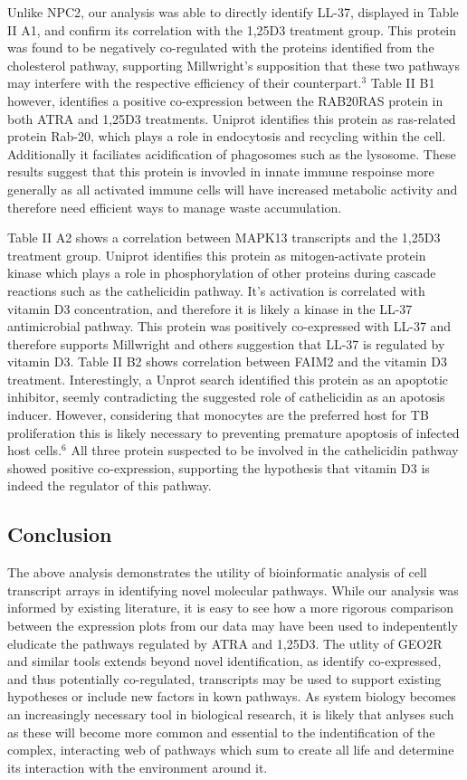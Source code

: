 \documentclass[letterpaper, 10 pt, conference]{ieeeconf}  %
\begin{document}
Unlike NPC2, our analysis was able to directly identify LL-37, displayed in Table II A1, and confirm its correlation with the 1,25D3 treatment group. This protein was found to be negatively co-regulated with the proteins identified from the cholesterol pathway, supporting Millwright's supposition that these two pathways may interfere with the respective efficiency of their counterpart.$^3$ Table II B1 however, identifies a positive co-expression between the RAB20RAS protein in both ATRA and 1,25D3 treatments. Uniprot identifies this protein as ras-related protein Rab-20, which plays a role in endocytosis and recycling within the cell. Additionally it faciliates acidification of phagosomes such as the lysosome. These results suggest that this protein is invovled in innate immune respoinse more generally as all activated immune cells will have increased metabolic activity and therefore need efficient ways to manage waste accumulation.

Table II A2 shows a correlation between MAPK13 transcripts and the 1,25D3 treatment group. Uniprot identifies this protein as mitogen-activate protein kinase which plays a role in phosphorylation of other proteins during cascade reactions such as the cathelicidin pathway. It's activation is correlated with vitamin D3 concentration, and therefore it is likely a kinase in the LL-37 antimicrobial pathway. This protein was positively co-expressed with LL-37 and therefore supports Millwright and others suggestion that LL-37 is regulated by vitamin D3. Table II B2 shows correlation between FAIM2 and the vitamin D3 treatment. Interestingly, a Unprot search identified this protein as an apoptotic inhibitor, seemly contradicting the suggested role of cathelicidin as an apotosis inducer. However, considering that monocytes are the preferred host for TB proliferation this is likely necessary to preventing premature apoptosis of infected host cells.$^6$ All three protein suspected to be involved in the cathelicidin pathway showed positive co-expression, supporting the hypothesis that vitamin D3 is indeed the regulator of this pathway.

\subsection{Conclusion}

The above analysis demonstrates the utility of bioinformatic analysis of cell transcript arrays in identifying novel molecular pathways. While our analysis was informed by existing literature, it is easy to see how a more rigorous comparison between the expression plots from our data may have been used to indepentently eludicate the pathways regulated by ATRA and 1,25D3. The utlity of GEO2R and similar tools extends beyond novel identification, as identify co-expressed, and thus potentially co-regulated, transcripts may be used to support existing hypotheses or include new factors in kown pathways. As system biology becomes an increasingly necessary tool in biological research, it is likely that anlyses such as these will become more common and essential to the indentification of the complex, interacting web of pathways which sum to create all life and determine its interaction with the environment around it.
\end{document}
